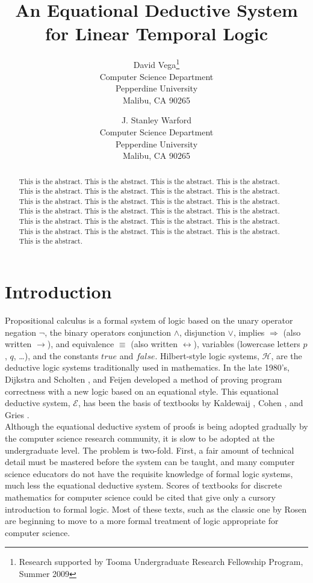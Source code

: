 \documentclass[fleqn, leqno]{article}
\title{An Equational Deductive System\\for Linear Temporal Logic}
\author{David Vega\thanks{Research supported by Tooma Undergraduate Research Fellowship Program, Summer 2009}\\
   Computer Science Department\\
   Pepperdine University\\
   Malibu, CA 90265
   \and
   J. Stanley Warford\\
   Computer Science Department\\
   Pepperdine University\\
   Malibu, CA 90265}
\date{} %
\newcommand{\impl}{\ensuremath{\Rightarrow}}        %
\begin{document}
\maketitle
\begin{abstract}
This is the abstract. This is the abstract. This is the abstract. This is the abstract. This is the abstract.
This is the abstract. This is the abstract. This is the abstract. This is the abstract. This is the abstract. 
This is the abstract. This is the abstract. This is the abstract. This is the abstract. This is the abstract. 
This is the abstract. This is the abstract. This is the abstract. This is the abstract. This is the abstract. 
This is the abstract. This is the abstract. This is the abstract. This is the abstract. This is the abstract. 
\end{abstract}

\thispagestyle{plain}

\section{Introduction}

Propositional calculus is a formal system of logic based on the unary operator negation $\lnot$,
the binary operators conjunction $\land$, disjunction $\lor$, implies $\impl$ (also written $\rightarrow$),
and equivalence $\equiv$ (also written $\leftrightarrow$),
variables (lowercase letters $p$, $q$, \dots), and the constants $true$ and $false$.
Hilbert-style logic systems, $\mathcal{H}$, are the deductive logic systems traditionally used in mathematics.
In the late 1980's, Dijkstra and Scholten \cite{DandS}, and Feijen \cite{Feij} developed a method of proving
program correctness with a new logic based on an equational style.
This equational deductive system, $\mathcal{E}$, has been the basis of textbooks by Kaldewaij \cite{Kald},
Cohen \cite{Cohen}, and Gries \cite{LADM}.\\

Although the equational deductive system of proofs is being adopted gradually by the computer science research community,
it is slow to be adopted at the undergraduate level. The problem is two-fold.
First, a fair amount of technical
detail must be mastered before the system can be taught, and many computer science educators do not have the requisite
knowledge of formal logic systems, much less the equational deductive system.
Scores of textbooks for discrete mathematics for computer science could be cited that give only a cursory introduction to
formal logic. Most of these texts, such as the classic one by Rosen \cite{Rosen} are beginning to move to a more
formal treatment of logic appropriate for computer science.\\
\end{document}
